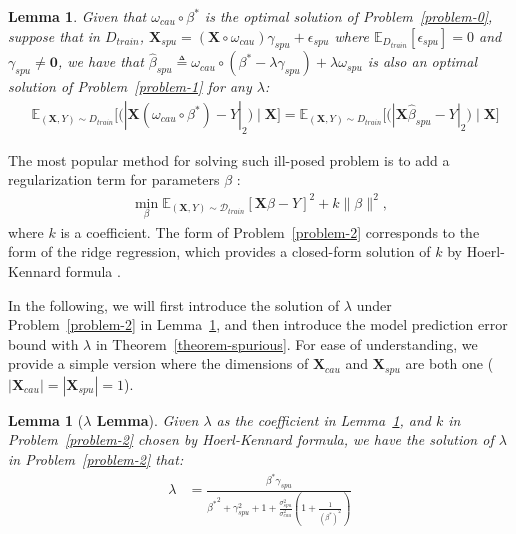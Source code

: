\documentclass{article}
\theoremstyle{plain}
\newtheorem{lemma}[theorem]{Lemma}
\theoremstyle{definition}
\theoremstyle{remark}
\begin{document}
\begin{lemma}
\label{lemma-equal}
Given that $\omega_{cau}\circ\beta^*$ is the optimal solution of Problem~\ref{problem-0},
suppose that in $D_{train}$, $\textbf{X}_{spu}=(\textbf{X}\circ\omega_{cau})\gamma_{spu}+\epsilon_{spu}$ where $\mathbb{E}_{D_{train}}[\epsilon_{spu}]=0$ and $\gamma_{spu}\neq\textbf{0}$, we have that $\hat{\beta}_{spu}\triangleq\omega_{cau}\circ(\beta^*-\lambda\gamma_{spu})+\lambda\omega_{spu}$ is also an optimal solution of Problem~\ref{problem-1} for any $\lambda$:
\begin{align}
    &\mathbb{E}_{(\textbf{X},Y)\sim D_{train}}\Big[\Big(|\textbf{X}(\omega_{cau}\circ\beta^*)-Y|_2\Big)\mid \textbf{X}\Big]
    =\mathbb{E}_{(\textbf{X},Y)\sim D_{train}}\Big[\Big(|\textbf{X}\hat{\beta}_{spu}-Y|_2\Big)\mid \textbf{X}\Big] \nonumber
\end{align}
\end{lemma}
The most popular method for solving such ill-posed problem is to add a regularization term for parameters $\beta$ \cite{DBLP:journals/corr/abs-1910-07113}:
\begin{align}
    \min_{\beta} \mathbb{E}_{(\textbf{X},Y)\sim\mathcal{D}_{train}}[\textbf{X}\beta-Y]^2+k\|\beta\|^2,
    \label{problem-2}
\end{align}
where $k$ is a coefficient. 
The form of Problem~\ref{problem-2} corresponds to the form of the ridge regression, which provides a closed-form solution of $k$ by Hoerl-Kennard formula \cite{10.2307/1271436}.

In the following, we will first introduce the solution of $\lambda$ under Problem~\ref{problem-2} in Lemma~\ref{lambda-lemma},
and then introduce the model prediction error bound with $\lambda$ in Theorem~\ref{theorem-spurious}.
For ease of understanding, we provide a simple version where the dimensions of $\textbf{X}_{cau}$ and $\textbf{X}_{spu}$ are both one ($|\textbf{X}_{cau}|=|\textbf{X}_{spu}|=1$).

\begin{lemma}[\textbf{$\lambda$ Lemma}]
\label{lambda-lemma}
Given $\lambda$ as the coefficient in Lemma~\ref{lemma-equal}, and $k$ in Problem~\ref{problem-2} chosen by Hoerl-Kennard formula, we have the solution of $\lambda$ in Problem~\ref{problem-2} that:
\begin{align}
\lambda
&=\frac{ \beta^*\gamma_{spu}}{{\beta^*}^2+ \gamma_{spu}^{2}+1+\frac{\sigma ^{2}_{spu}}{\sigma^2_{cau}}(1+\frac{1}{(\beta^*)^2})}
\label{formula-lambda}
\end{align}
\end{lemma}
\end{document}

